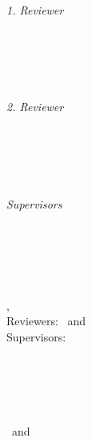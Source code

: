 \begin{titlepage}
	\vfill
	{\large \thesisSubject} \\[5mm]
	{\LARGE \color{ctcolortitle}\textbf{\thesisTitle} \\[10mm]}
	{\Large \thesisName} \\

	\vfill
	\begin{minipage}[t]{.27\textwidth}
		\raggedleft
		\textit{1. Reviewer}
	\end{minipage}
	\hspace*{15pt}
	\begin{minipage}[t]{.65\textwidth}
		{\Large \thesisFirstReviewer} \\
	  	{\small \thesisFirstReviewerDepartment} \\[-1mm]
		{\small \thesisFirstReviewerUniversity}
	\end{minipage} \\[5mm]
	\begin{minipage}[t]{.27\textwidth}
		\raggedleft
		\textit{2. Reviewer}
	\end{minipage}
	\hspace*{15pt}
	\begin{minipage}[t]{.65\textwidth}
		{\Large \thesisSecondReviewer} \\
	  	{\small \thesisSecondReviewerDepartment} \\[-1mm]
		{\small \thesisSecondReviewerUniversity}
	\end{minipage} \\[10mm]
	\begin{minipage}[t]{.27\textwidth}
		\raggedleft
		\textit{Supervisors}
	\end{minipage}
	\hspace*{15pt}
	\begin{minipage}[t]{.65\textwidth}
		\thesisFirstSupervisor
	\end{minipage} \\[10mm]

	\thesisDate \\

\end{titlepage}


\hfill
\vfill
{
	\small
	\textbf{\thesisName} \\
	\textit{\thesisTitle} \\
	\thesisSubject, \thesisDate \\
	Reviewers: \thesisFirstReviewer\ and \thesisSecondReviewer \\
	Supervisors: \thesisFirstSupervisor \\[1.5em]
	\textbf{\thesisUniversity} \\
	\textit{\thesisUniversityGroup} \\
	\thesisUniversityInstitute \\
	\thesisUniversityDepartment \\
	\thesisUniversityStreetAddress \\
	\thesisUniversityPostalCode\ and \thesisUniversityCity
}

